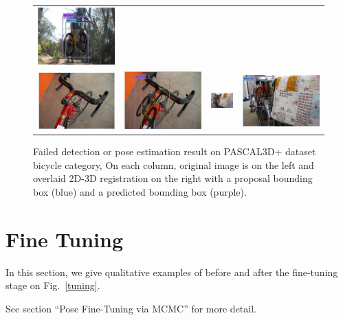 \documentclass[10pt,twocolumn,letterpaper]{article}
\begin{document}
\begin{figure}[h]
\begin{tabular}{|cc|cc|}
  \includegraphics[width=0.22\linewidth]{supp/pas_bicycle17b.png}  \\ 
  \includegraphics[width=0.22\linewidth]{supp/pas_bicycle18a.png} &
  \includegraphics[width=0.22\linewidth]{supp/pas_bicycle18b.png} & 
  \includegraphics[width=0.22\linewidth]{supp/pas_bicycle19a.png}  &
  \includegraphics[width=0.22\linewidth]{supp/pas_bicycle19b.png}  \\   \hline
  \end{tabular}
\caption{Failed detection or pose estimation result on PASCAL3D+ dataset
  bicycle category, On each column, original image is on the left and overlaid
  2D-3D registration on the right with a proposal bounding box (blue) and a
  predicted bounding box (purple).} 
  \label{fig:pascal3d_bicycle_bad}
\end{figure}


\section{Fine Tuning}

In this section, we give qualitative examples of before and after the
fine-tuning stage on Fig.~\ref{tuning}.

See section ``Pose Fine-Tuning via MCMC'' for more detail.
\end{document}
